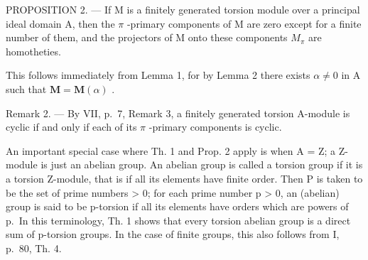 PROPOSITION 2. --- If M is a finitely generated torsion module over a principal ideal domain A, then the \(\pi\) -primary components of M are zero except for a finite number of them, and the projectors of M onto these components \(M_{\pi}\) are homotheties.

This follows immediately from Lemma 1, for by Lemma 2 there exists \(\alpha \neq 0\) in A such that \(\mathbf{M} = \mathbf{M}(\alpha)\) .

Remark 2. --- By VII, p.~7, Remark 3, a finitely generated torsion A-module is cyclic if and only if each of its \(\pi\) -primary components is cyclic.

An important special case where Th. 1 and Prop. 2 apply is when A = Z; a Z-module is just an abelian group. An abelian group is called a torsion group if it is a torsion Z-module, that is if all its elements have finite order. Then P is taken to be the set of prime numbers \textgreater{} 0; for each prime number p \textgreater{} 0, an (abelian) group is said to be p-torsion if all its elements have orders which are powers of p.~In this terminology, Th. 1 shows that every torsion abelian group is a direct sum of p-torsion groups. In the case of finite groups, this also follows from I, p.~80, Th. 4.

